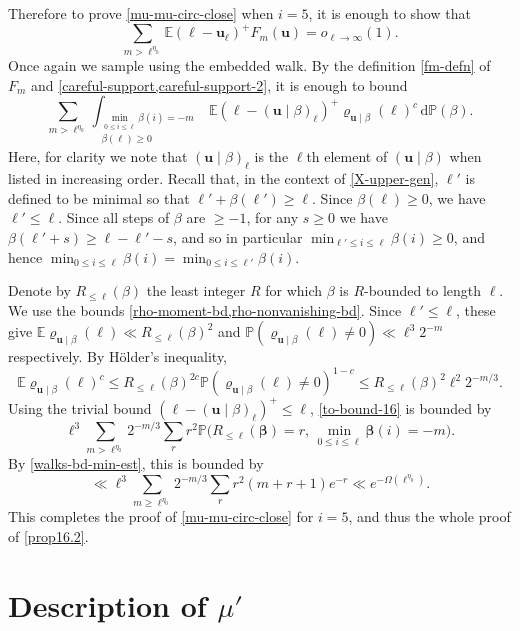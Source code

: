 \documentclass[11pt,reqno]{amsart}
\numberwithin{equation}{section}
\theoremstyle{definition}
\theoremstyle{remark}
\newcommand{\mb}{\mathbb}
\newcommand{\mbf}{\mathbf}
\def\boldbeta{\boldsymbol\beta}
\renewcommand{\le}{\leqslant}
\renewcommand{\ge}{\geqslant}
\begin{document}
Therefore to prove \cref{mu-mu-circ-close} when $i = 5$, it is enough to show that
\begin{equation*} \sum_{m > \ell^{\eta_0} }\mb{E} (\ell - \mbf{u}_{\ell})^+ F_m(\mbf{u}) = o_{\ell \rightarrow \infty}(1).\end{equation*}
Once again we sample using the embedded walk. By the definition \cref{fm-defn} of $F_m$ and \cref{careful-support,careful-support-2}, it is enough to bound
\begin{equation}\label{to-bound-16} \sum_{m > \ell^{\eta_0}} \int_{\substack{\min_{0 \le i \le \ell} \beta(i) = -m \\ \beta(\ell) \ge 0}}  \mb{E}(\ell - (\mbf{u} \mid \beta)_{\ell})^+\varrho_{\mbf{u} \mid \beta}(\ell)^c\, \mathrm{d}\mb{P}(\beta) .\end{equation}
Here, for clarity we note that $(\mbf{u} \mid \beta)_{\ell}$ is the $\ell$th element of $(\mbf{u} \mid \beta)$ when listed in increasing order.
Recall that, in the context of \cref{X-upper-gen}, $\ell'$ is defined to be minimal so that $\ell' + \beta(\ell') \ge \ell$. Since $\beta(\ell) \ge 0$, we have $\ell' \le \ell$. Since all steps of $\beta$ are $\ge -1$, for any $s \ge 0$ we have $\beta(\ell' + s) \ge \ell - \ell' - s$, and so in particular $\min_{\ell' \le i \le \ell} \beta(i) \ge 0$, and hence $\min_{0 \le i \le \ell} \beta(i) = \min_{0 \le i \le \ell'} \beta(i)$.

Denote by $R_{\le \ell}(\beta)$ the least integer $R$ for which $\beta$ is $R$-bounded to length $\ell$. We use the bounds \cref{rho-moment-bd,rho-nonvanishing-bd}. Since $\ell' \le \ell$, these give $\mb{E} \varrho_{\mbf{u} \mid \beta}(\ell) \ll R_{\le \ell}(\beta)^2$ and  $\mb{P}(\varrho_{\mbf{u} \mid \beta}(\ell) \ne 0) \ll \ell^3 2^{-m}$ respectively. By H\"older's inequality, 
\[ \mb{E} \varrho_{\mbf{u} \mid \beta}(\ell)^c \le R_{\le \ell}(\beta)^{2c} \mb{P}(\varrho_{\mbf{u} \mid \beta}(\ell) \ne 0)^{1 - c} \le R_{\le \ell}(\beta)^2 \ell^2 2^{-m/3}.\]
Using the trivial bound $(\ell - (\mbf{u} \mid \beta)_{\ell})^+ \le \ell$, \cref{to-bound-16} is bounded by
\[ \ell^3 \sum_{m > \ell^{\eta_0}} 2^{-m/3} \sum_{r} r^2 \mb{P} \big( R_{\le \ell}(\boldbeta) = r, \, \min_{0 \le i \le \ell} \boldbeta(i) = -m\big).\]
By \cref{walks-bd-min-est}, this is bounded by
\[ \ll \ell^3 \sum_{m \ge \ell^{\eta_0}} 2^{-m/3} \sum_r r^2 (m + r + 1)e^{-r}  \ll e^{-\Omega(\ell^{\eta_0})}.\]
This completes the proof of \cref{mu-mu-circ-close} for $i = 5$, and thus the whole proof of \cref{prop16.2}.


\section{Description of \texorpdfstring{$\mu'$}{}}\label{sec17}
\end{document}

